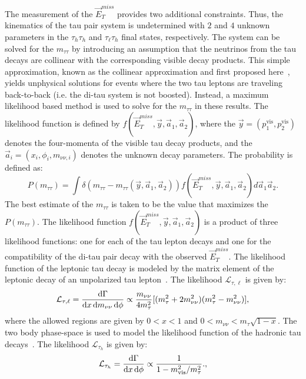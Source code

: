 The measurement of the $\vec{E}_{T}^{miss}$ provides two additional constraints. Thus, the kinematics of the tau pair system is undetermined with $2$ and $4$ unknown parameters in the $\tau_h\tau_h$ and $\tau_{\ell}\tau_h$ final states, respectively.  The system can be solved for the $m_{\tau\tau}$ by introducing an assumption that the neutrinos from the tau decays are collinear with the corresponding visible decay products. This simple approximation, known as the collinear approximation and first proposed here~\cite{Ellis:1987xu}, yields unphysical solutions for events where the two tau leptons are traveling back-to-back (i.e. the di-tau system is not boosted). Instead, a maximum likelihood based method is used to solve for the $m_{\tau\tau}$ in these results. The likelihood function is defined by $f(\vec{E}_T^{miss},\vec{y},\vec{a}_1,\vec{a}_2)$, where the $\vec{y}=(p_1^{\mathrm{vis}},p_2^{\mathrm{vis}})$ denotes the four-momenta of the visible tau decay products, and the $\vec{a}_i=(x_i,\phi_i,m_{\nu\nu,i})$ denotes the unknown decay parameters. The probability is defined as:
\begin{equation} \label{eq:prob}
P(m_{\tau\tau}) = \int \delta(m_{\tau\tau}-m_{\tau\tau}(\vec{y},\vec{a}_1,\vec{a}_2)) f(\vec{E}_T^{miss}, \vec{y},\vec{a}_1,\vec{a}_2)d\vec{a}_1\vec{a}_2.
\end{equation}
The best estimate of the $m_{\tau\tau}$ is taken to be the value that maximizes the $P(m_{\tau\tau})$. The likelihood function $f(\vec{E}_T^{miss},\vec{y},\vec{a}_1,\vec{a}_2)$ is a product of three likelihood functions: one for each of the tau lepton decays and one for the compatibility of the di-tau pair decay with the observed $\vec{E}_T^{miss}$. The likelihood function of the leptonic tau decay is modeled by the matrix element of the leptonic decay of an unpolarized tau lepton~\cite{TauPol}. The likelihood $\mathcal{L}_{\tau,\ell}$ is given by:     
\begin{equation} 
\mathcal{L}_{\tau,\ell} = \frac{{\rm d}\Gamma}{{\rm d}x\,{\rm d}m_{\nu\nu}\,{\rm d}\phi} \propto \frac{m_{\nu\nu}}{4m_{\tau}^2} [(m_{\tau}^2 +2m_{\nu\nu}^2 )(m_{\tau}^2 - m_{\nu\nu}^2)],
\label{eq:likelihoodLepTauDecay}
\end{equation}
where the allowed regions are given by $0<x<1$ and $0<m_{\nu\nu}<m_{\tau}\sqrt{1-x}$. The two body phase-space is used to model the likelihood function of the hadronic tau decays~\cite{Agashe:2014kda}. The likelihood  $\mathcal{L}_{\tau_{h}}$ is given by:
\begin{equation}
\mathcal{L}_{\tau_{h}} = \frac{{\rm d}\Gamma}{{\rm d}x\,{\rm d}\phi} \propto \frac{1}{1- m^2_{\rm vis}/m^2_{\tau}}.,
\label{eq:likelihoodHadTauDecay}
\end{equation}
